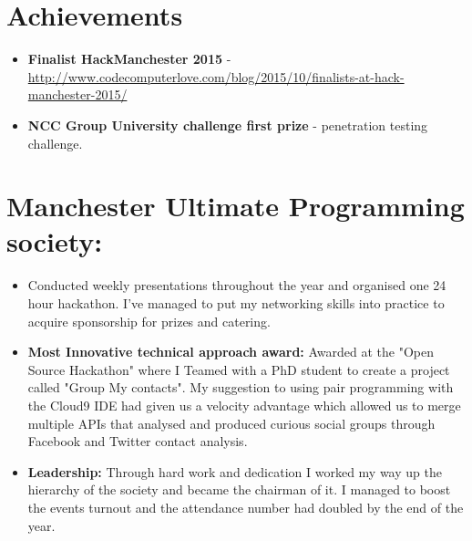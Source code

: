 \documentclass[12pt,a4paper]{res}
\begin{document}
\begin{resume}
\newpage 

\section{\large\bf Achievements}
  \begin{itemize}
  \item {\bf Finalist HackManchester 2015} - \url{http://www.codecomputerlove.com/blog/2015/10/finalists-at-hack-manchester-2015/}
  \item {\bf NCC Group University challenge first prize} - penetration testing challenge.
  \end{itemize}

\section{\bf Manchester Ultimate Programming society:}
\vspace{5mm}    
    \begin{itemize}
    \item[] Conducted weekly presentations throughout the year and organised one 24 hour hackathon. I've managed to put my networking skills into practice to acquire sponsorship for prizes and catering.
    \item{\bf Most Innovative technical approach award:} Awarded at the "Open Source Hackathon" where I Teamed with a PhD student to create a project called "Group My contacts". My suggestion to using pair programming with the Cloud9 IDE had given us a velocity advantage which allowed us to merge multiple APIs that analysed and produced curious social groups through Facebook and Twitter contact analysis.

      \item {\bf Leadership:} Through hard work and dedication I worked my way up the hierarchy of the society and became the chairman of it. I managed to boost the events turnout and the attendance number had doubled by the end of the year.
     \end{itemize}


\end{resume}
\end{document}

